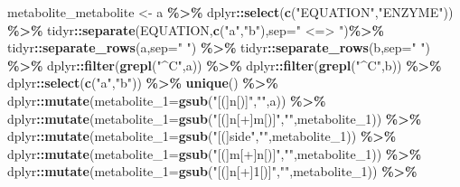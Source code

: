 \documentclass[
]{book}
\newenvironment{Shaded}{\begin{snugshade}}{\end{snugshade}}
\newcommand{\AttributeTok}[1]{\textcolor[rgb]{0.13,0.29,0.53}{#1}}
\newcommand{\FunctionTok}[1]{\textcolor[rgb]{0.13,0.29,0.53}{\textbf{#1}}}
\newcommand{\NormalTok}[1]{#1}
\newcommand{\OtherTok}[1]{\textcolor[rgb]{0.56,0.35,0.01}{#1}}
\newcommand{\SpecialCharTok}[1]{\textcolor[rgb]{0.81,0.36,0.00}{\textbf{#1}}}
\newcommand{\StringTok}[1]{\textcolor[rgb]{0.31,0.60,0.02}{#1}}
\begin{document}
\begin{Shaded}
\begin{Highlighting}[]
\NormalTok{metabolite\_metabolite }\OtherTok{\textless{}{-}}\NormalTok{ a }\SpecialCharTok{\%\textgreater{}\%}
\NormalTok{  dplyr}\SpecialCharTok{::}\FunctionTok{select}\NormalTok{(}\FunctionTok{c}\NormalTok{(}\StringTok{"EQUATION"}\NormalTok{,}\StringTok{"ENZYME"}\NormalTok{)) }\SpecialCharTok{\%\textgreater{}\%}
\NormalTok{  tidyr}\SpecialCharTok{::}\FunctionTok{separate}\NormalTok{(EQUATION,}\FunctionTok{c}\NormalTok{(}\StringTok{"a"}\NormalTok{,}\StringTok{"b"}\NormalTok{),}\AttributeTok{sep=}\StringTok{" \textless{}=\textgreater{} "}\NormalTok{)}\SpecialCharTok{\%\textgreater{}\%}
\NormalTok{  tidyr}\SpecialCharTok{::}\FunctionTok{separate\_rows}\NormalTok{(a,}\AttributeTok{sep=}\StringTok{" "}\NormalTok{) }\SpecialCharTok{\%\textgreater{}\%}
\NormalTok{  tidyr}\SpecialCharTok{::}\FunctionTok{separate\_rows}\NormalTok{(b,}\AttributeTok{sep=}\StringTok{" "}\NormalTok{) }\SpecialCharTok{\%\textgreater{}\%}
\NormalTok{  dplyr}\SpecialCharTok{::}\FunctionTok{filter}\NormalTok{(}\FunctionTok{grepl}\NormalTok{(}\StringTok{"\^{}C"}\NormalTok{,a)) }\SpecialCharTok{\%\textgreater{}\%}
\NormalTok{  dplyr}\SpecialCharTok{::}\FunctionTok{filter}\NormalTok{(}\FunctionTok{grepl}\NormalTok{(}\StringTok{"\^{}C"}\NormalTok{,b)) }\SpecialCharTok{\%\textgreater{}\%}
\NormalTok{  dplyr}\SpecialCharTok{::}\FunctionTok{select}\NormalTok{(}\FunctionTok{c}\NormalTok{(}\StringTok{"a"}\NormalTok{,}\StringTok{"b"}\NormalTok{)) }\SpecialCharTok{\%\textgreater{}\%}
  \FunctionTok{unique}\NormalTok{() }\SpecialCharTok{\%\textgreater{}\%}
\NormalTok{  dplyr}\SpecialCharTok{::}\FunctionTok{mutate}\NormalTok{(}\AttributeTok{metabolite\_1=}\FunctionTok{gsub}\NormalTok{(}\StringTok{"[(]n[)]"}\NormalTok{,}\StringTok{""}\NormalTok{,a)) }\SpecialCharTok{\%\textgreater{}\%}
\NormalTok{  dplyr}\SpecialCharTok{::}\FunctionTok{mutate}\NormalTok{(}\AttributeTok{metabolite\_1=}\FunctionTok{gsub}\NormalTok{(}\StringTok{"[(]n[+]m[)]"}\NormalTok{,}\StringTok{""}\NormalTok{,metabolite\_1)) }\SpecialCharTok{\%\textgreater{}\%}
\NormalTok{  dplyr}\SpecialCharTok{::}\FunctionTok{mutate}\NormalTok{(}\AttributeTok{metabolite\_1=}\FunctionTok{gsub}\NormalTok{(}\StringTok{"[(]side"}\NormalTok{,}\StringTok{""}\NormalTok{,metabolite\_1)) }\SpecialCharTok{\%\textgreater{}\%}
\NormalTok{  dplyr}\SpecialCharTok{::}\FunctionTok{mutate}\NormalTok{(}\AttributeTok{metabolite\_1=}\FunctionTok{gsub}\NormalTok{(}\StringTok{"[(]m[+]n[)]"}\NormalTok{,}\StringTok{""}\NormalTok{,metabolite\_1)) }\SpecialCharTok{\%\textgreater{}\%}
\NormalTok{  dplyr}\SpecialCharTok{::}\FunctionTok{mutate}\NormalTok{(}\AttributeTok{metabolite\_1=}\FunctionTok{gsub}\NormalTok{(}\StringTok{"[(]n[+]1[)]"}\NormalTok{,}\StringTok{""}\NormalTok{,metabolite\_1)) }\SpecialCharTok{\%\textgreater{}\%}

\end{Highlighting}
\end{Shaded}
\end{document}
